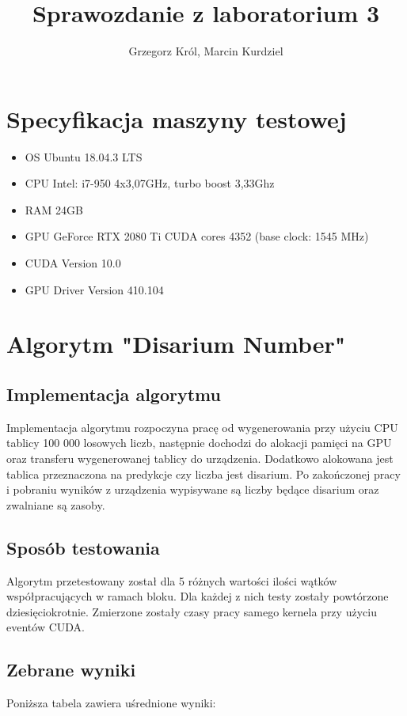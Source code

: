 \documentclass[12pt]{article}
\title{Sprawozdanie z laboratorium 3}
\author{Grzegorz Król, Marcin Kurdziel}
\begin{document}
 	\maketitle
 	
 	\section{Specyfikacja maszyny testowej}
 		\begin{itemize}
 			\item OS Ubuntu 18.04.3 LTS
 			\item CPU Intel: i7-950 4x3,07GHz, turbo boost 3,33Ghz
 			\item RAM 24GB
 			\item GPU GeForce RTX 2080 Ti CUDA cores 4352 (base clock: 1545 MHz)
 			\item CUDA Version 10.0
 			\item GPU Driver Version 410.104
 		\end{itemize}
 	
 	\section{Algorytm "Disarium Number"}
 		\subsection{Implementacja algorytmu}
 			Implementacja algorytmu rozpoczyna pracę od wygenerowania przy użyciu CPU tablicy 100 000 losowych liczb, następnie dochodzi do alokacji pamięci na GPU oraz transferu wygenerowanej tablicy do urządzenia. Dodatkowo alokowana jest tablica przeznaczona na predykcje czy liczba jest disarium. Po zakończonej pracy i pobraniu wyników z urządzenia wypisywane są liczby będące disarium oraz zwalniane są zasoby.
 		
 		\subsection{Sposób testowania}
 			Algorytm przetestowany został dla 5 różnych wartości ilości wątków współpracujących w ramach bloku. Dla każdej z nich testy zostały powtórzone dziesięciokrotnie. Zmierzone zostały czasy pracy samego kernela przy użyciu eventów CUDA. 
 		
 		\subsection{Zebrane wyniki}	
 			Poniższa tabela zawiera uśrednione wyniki:
 		
\end{document}
